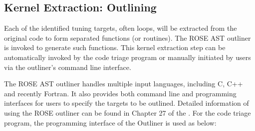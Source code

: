 %
%
%
%

\subsection{Kernel Extraction: Outlining}
Each of the identified tuning targets, often loops, will be extracted from the original code to
form separated functions (or routines). 
The ROSE AST outliner is invoked to generate such functions. 
This kernel extraction step can be automatically invoked by the code triage
program or manually initiated by users via the outliner's command line
interface. 

The ROSE AST outliner handles multiple input languages, including C, C++ and
recently Fortran.  It also provides both command line and programming interfaces for users
to specify the targets to be outlined.  
Detailed information of using the ROSE outliner can be found in
Chapter 27 of the .
For the code triage program, the programming interface of the Outliner is
used as below:

